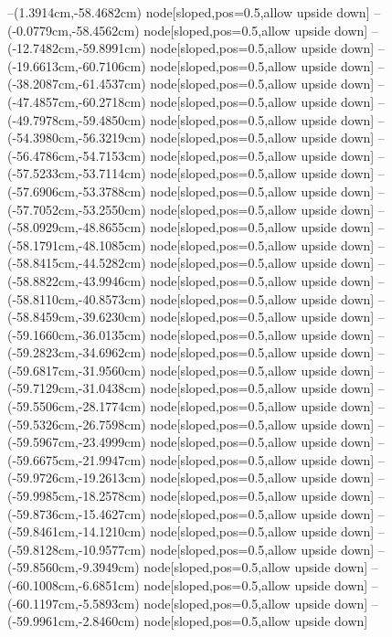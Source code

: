 --(1.3914cm,-58.4682cm) node[sloped,pos=0.5,allow upside down]{\ArrowIn}
--(-0.0779cm,-58.4562cm) node[sloped,pos=0.5,allow upside down]{\ArrowIn}
--(-12.7482cm,-59.8991cm) node[sloped,pos=0.5,allow upside down]{\ArrowIn}
--(-19.6613cm,-60.7106cm) node[sloped,pos=0.5,allow upside down]{\ArrowIn}
--(-38.2087cm,-61.4537cm) node[sloped,pos=0.5,allow upside down]{\ArrowIn}
--(-47.4857cm,-60.2718cm) node[sloped,pos=0.5,allow upside down]{\ArrowIn}
--(-49.7978cm,-59.4850cm) node[sloped,pos=0.5,allow upside down]{\ArrowIn}
--(-54.3980cm,-56.3219cm) node[sloped,pos=0.5,allow upside down]{\ArrowIn}
--(-56.4786cm,-54.7153cm) node[sloped,pos=0.5,allow upside down]{\ArrowIn}
--(-57.5233cm,-53.7114cm) node[sloped,pos=0.5,allow upside down]{\ArrowIn}
--(-57.6906cm,-53.3788cm) node[sloped,pos=0.5,allow upside down]{\arrowIn}
--(-57.7052cm,-53.2550cm) node[sloped,pos=0.5,allow upside down]{\arrowIn}
--(-58.0929cm,-48.8655cm) node[sloped,pos=0.5,allow upside down]{\ArrowIn}
--(-58.1791cm,-48.1085cm) node[sloped,pos=0.5,allow upside down]{\arrowIn}
--(-58.8415cm,-44.5282cm) node[sloped,pos=0.5,allow upside down]{\ArrowIn}
--(-58.8822cm,-43.9946cm) node[sloped,pos=0.5,allow upside down]{\arrowIn}
--(-58.8110cm,-40.8573cm) node[sloped,pos=0.5,allow upside down]{\ArrowIn}
--(-58.8459cm,-39.6230cm) node[sloped,pos=0.5,allow upside down]{\ArrowIn}
--(-59.1660cm,-36.0135cm) node[sloped,pos=0.5,allow upside down]{\ArrowIn}
--(-59.2823cm,-34.6962cm) node[sloped,pos=0.5,allow upside down]{\ArrowIn}
--(-59.6817cm,-31.9560cm) node[sloped,pos=0.5,allow upside down]{\ArrowIn}
--(-59.7129cm,-31.0438cm) node[sloped,pos=0.5,allow upside down]{\arrowIn}
--(-59.5506cm,-28.1774cm) node[sloped,pos=0.5,allow upside down]{\ArrowIn}
--(-59.5326cm,-26.7598cm) node[sloped,pos=0.5,allow upside down]{\ArrowIn}
--(-59.5967cm,-23.4999cm) node[sloped,pos=0.5,allow upside down]{\ArrowIn}
--(-59.6675cm,-21.9947cm) node[sloped,pos=0.5,allow upside down]{\ArrowIn}
--(-59.9726cm,-19.2613cm) node[sloped,pos=0.5,allow upside down]{\ArrowIn}
--(-59.9985cm,-18.2578cm) node[sloped,pos=0.5,allow upside down]{\ArrowIn}
--(-59.8736cm,-15.4627cm) node[sloped,pos=0.5,allow upside down]{\ArrowIn}
--(-59.8461cm,-14.1210cm) node[sloped,pos=0.5,allow upside down]{\ArrowIn}
--(-59.8128cm,-10.9577cm) node[sloped,pos=0.5,allow upside down]{\ArrowIn}
--(-59.8560cm,-9.3949cm) node[sloped,pos=0.5,allow upside down]{\ArrowIn}
--(-60.1008cm,-6.6851cm) node[sloped,pos=0.5,allow upside down]{\ArrowIn}
--(-60.1197cm,-5.5893cm) node[sloped,pos=0.5,allow upside down]{\ArrowIn}
--(-59.9961cm,-2.8460cm) node[sloped,pos=0.5,allow upside down]{\ArrowIn}
